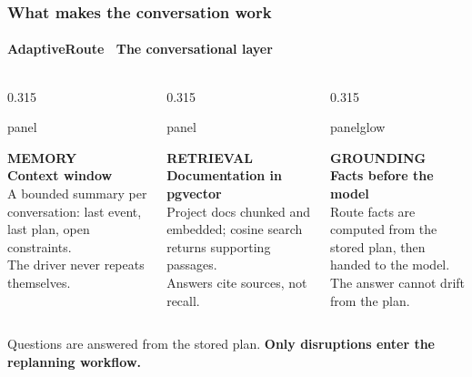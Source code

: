 \documentclass[aspectratio=169,10pt]{beamer}
\newcommand{\cy}[1]{{\color{arCyan2}\bfseries #1}}
\newcommand{\muted}[1]{{\color{arMuted} #1}}
\newcommand{\faint}[1]{{\color{arFaint}\small #1}}
\newcommand{\plabel}[1]{{\color{arCyan2}\fontsize{6.4}{7.6}\selectfont\bfseries\MakeUppercase{#1}}}
\newcommand{\ptitle}[1]{{\color{arText}\large\bfseries #1}}
\newenvironment{panel}[1]{%
  \begin{beamercolorbox}[wd=#1,rounded=true,shadow=false,sep=7pt]{panel}%
}{%
  \end{beamercolorbox}%
}
\newenvironment{panelglow}[1]{%
  \begin{beamercolorbox}[wd=#1,rounded=true,shadow=false,sep=7pt]{panelglow}%
}{%
  \end{beamercolorbox}%
}
\begin{document}
\begin{frame}
  \frametitle{What makes the conversation work}
  \framesubtitle{AdaptiveRoute \textperiodcentered\ The conversational layer}

  \vspace{0.7em}
  \begin{columns}[T]
    \begin{column}{0.315\linewidth}
      \begin{panel}{\linewidth}
        \plabel{Memory}\\[0.5em]
        \ptitle{Context window}\\[0.45em]
        \muted{\small A bounded summary per conversation: last event, last plan, open
        constraints.}\\[0.6em]
        \faint{The driver never repeats themselves.}
      \end{panel}
    \end{column}
    \begin{column}{0.315\linewidth}
      \begin{panel}{\linewidth}
        \plabel{Retrieval}\\[0.5em]
        \ptitle{Documentation in pgvector}\\[0.45em]
        \muted{\small Project docs chunked and embedded; cosine search returns supporting
        passages.}\\[0.6em]
        \faint{Answers cite sources, not recall.}
      \end{panel}
    \end{column}
    \begin{column}{0.315\linewidth}
      \begin{panelglow}{\linewidth}
        \plabel{Grounding}\\[0.5em]
        \ptitle{Facts before the model}\\[0.45em]
        \muted{\small Route facts are computed from the stored plan, then handed to the
        model.}\\[0.6em]
        \faint{The answer cannot drift from the plan.}
      \end{panelglow}
    \end{column}
  \end{columns}

  \vspace{1.1em}
  \centering
  \small Questions are answered from the stored plan.
  \cy{Only disruptions enter the replanning workflow.}


\end{frame}
\end{document}
